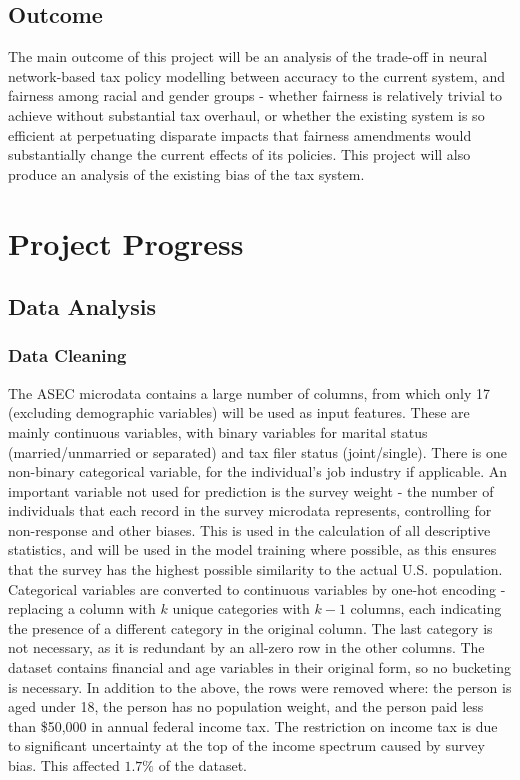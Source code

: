 \documentclass[conference]{IEEEtran}
\begin{document}
\subsection{Outcome}
The main outcome of this project will be an analysis of the trade-off in neural network-based tax policy modelling between accuracy to the current system, and fairness among racial and gender groups - whether fairness is relatively trivial to achieve without substantial tax overhaul, or whether the existing system is so efficient at perpetuating disparate impacts that fairness amendments would substantially change the current effects of its policies. This project will also produce an analysis of the existing bias of the tax system.

\section{Project Progress}
\subsection{Data Analysis}
\subsubsection{Data Cleaning}
The ASEC microdata contains a large number of columns, from which only 17 (excluding demographic variables) will be used as input features. These are mainly continuous variables, with binary variables for marital status (married/unmarried or separated) and tax filer status (joint/single). There is one non-binary categorical variable, for the individual's job industry if applicable. An important variable not used for prediction is the survey weight - the number of individuals that each record in the survey microdata represents, controlling for non-response and other biases. This is used in the calculation of all descriptive statistics, and will be used in the model training where possible, as this ensures that the survey has the highest possible similarity to the actual U.S. population. Categorical variables are converted to continuous variables by one-hot encoding - replacing a column with $k$ unique categories with $k-1$ columns, each indicating the presence of a different category in the original column. The last category is not necessary, as it is redundant by an all-zero row in the other columns. The dataset contains financial and age variables in their original form, so no bucketing is necessary. In addition to the above, the rows were removed where: the person is aged under 18, the person has no population weight, and the person paid less than \$50,000 in annual federal income tax. The restriction on income tax is due to significant uncertainty at the top of the income spectrum caused by survey bias\cite{RePEc:inq:inqwps:ecineq2017-452}. This affected $1.7\%$ of the dataset.
\end{document}
